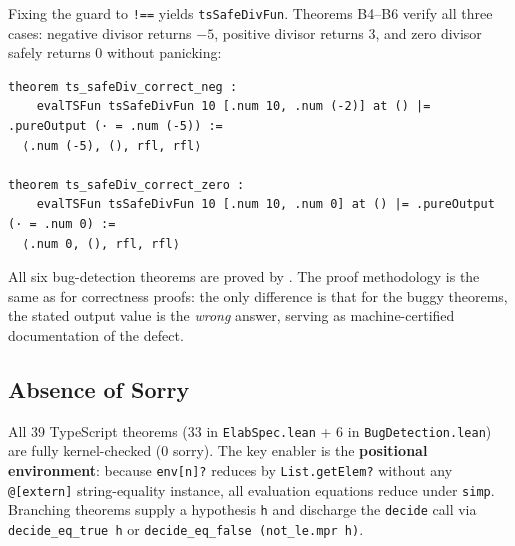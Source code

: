\noindent
Fixing the guard to \texttt{!==} yields \texttt{tsSafeDivFun}.
Theorems B4--B6 verify all three cases: negative divisor returns $-5$,
positive divisor returns $3$, and zero divisor safely returns $0$
without panicking:

\begin{lstlisting}[caption={B4--B6: fixed safeDiv verified for all divisor signs.},label={lst:b46}]
theorem ts_safeDiv_correct_neg :
    evalTSFun tsSafeDivFun 10 [.num 10, .num (-2)] at () |= .pureOutput (· = .num (-5)) :=
  ⟨.num (-5), (), rfl, rfl⟩

theorem ts_safeDiv_correct_zero :
    evalTSFun tsSafeDivFun 10 [.num 10, .num 0] at () |= .pureOutput (· = .num 0) :=
  ⟨.num 0, (), rfl, rfl⟩
\end{lstlisting}

\noindent
All six bug-detection theorems are proved by \rfl.
The proof methodology is the same as for correctness proofs: the only
difference is that for the buggy theorems, the stated output value is the
\emph{wrong} answer, serving as machine-certified documentation of the defect.

\subsection{Absence of Sorry}

All 39 TypeScript theorems (33 in \texttt{ElabSpec.lean} + 6 in \texttt{BugDetection.lean})
are fully kernel-checked (0 sorry).
The key enabler is the \textbf{positional environment}: because
\texttt{env[n]?} reduces by \texttt{List.getElem?} without any
\texttt{@[extern]} string-equality instance, all evaluation equations
reduce under \texttt{simp}. Branching theorems supply a hypothesis
\texttt{h} and discharge the \texttt{decide} call via
\texttt{decide\_eq\_true h} or \texttt{decide\_eq\_false (not\_le.mpr h)}.
